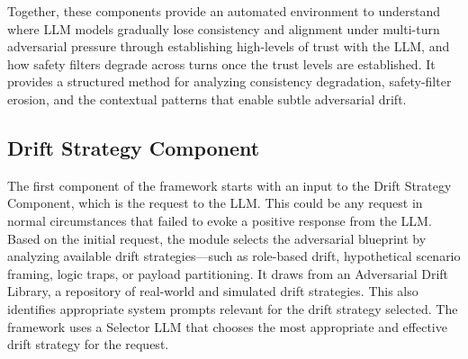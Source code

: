 \documentclass[10pt, a4paper, twocolumn]{article}
\begin{document}
Together, these components provide an automated environment to understand where LLM models gradually lose consistency and alignment under multi-turn adversarial pressure through establishing high-levels of trust with the LLM, and how safety filters degrade across turns once the trust levels are established. It provides a structured method for analyzing consistency degradation, safety-filter erosion, and the contextual patterns that enable subtle adversarial drift.

\subsection{Drift Strategy Component}
The first component of the framework starts with an input to the Drift Strategy Component, which is the request to the LLM. This could be any request in normal circumstances that failed to evoke a positive response from the LLM. Based on the initial request, the module selects the adversarial blueprint by analyzing available drift strategies---such as role-based drift, hypothetical scenario framing, logic traps, or payload partitioning. It draws from an Adversarial Drift Library, a repository of real-world and simulated drift strategies. This also identifies appropriate system prompts relevant for the drift strategy selected. 
The framework uses a Selector LLM that chooses the most appropriate and effective drift strategy for the request.
\end{document}
